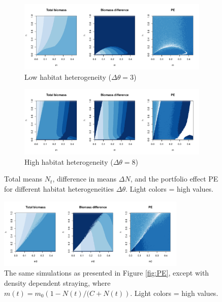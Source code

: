 \documentclass[twocolumn,preprintnumbers,amsmath,amssymb,superscriptaddress]{revtex4}
\begin{document}
\begin{figure}
  \captionsetup{justification=raggedright,
singlelinecheck=false
}
\centering
\begin{subfigure}[t]{0.55\textwidth}
\centering
\includegraphics[width=\textwidth]{figs/fig_MDPE_hm_theta3.pdf} 
\caption{Low habitat heterogeneity ($\Delta\theta=3$)} \label{fig:thetadiff1}
\end{subfigure}
\begin{subfigure}[t]{0.55\textwidth}
\centering
\includegraphics[width=\textwidth]{figs/fig_MDPE_hm_theta8.pdf} 
\caption{High habitat heterogeneity ($\Delta\theta=8$)} \label{fig:thetadiff2}
\end{subfigure}
\caption{Total means $N_t$, difference in means $\Delta N$, and the portfolio effect PE for different habitat heterogeneities $\Delta\theta$. Light colors = high values.
}
\end{figure}


\begin{figure}
  \captionsetup{justification=raggedright,
singlelinecheck=false
}
\centering
\includegraphics[width=0.8\textwidth]{figs/fig_MDPE_hm_ddm.pdf}
\caption{
The same simulations as presented in Figure \ref{fig:PE}, except with density dependent straying, where $m(t) = m_0\left(1-N(t)/(C+N(t)\right)$. Light colors = high values.
} \label{fig:ddm}
\end{figure}
\end{document}
